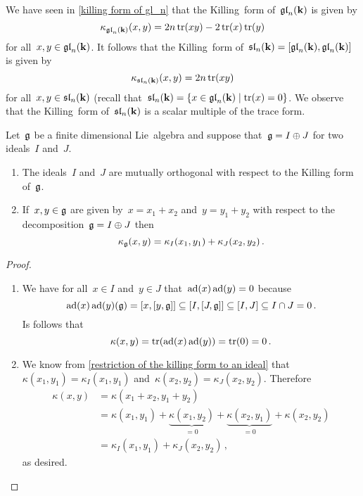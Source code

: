 

\begin{example}
  We have seen in \cref{killing form of gl_n} that the Killing~form of~$\mathfrak{gl}_n(\mathbf{k})$ is given by
  \[
    \kappa_{\mathfrak{gl}_n(\mathbf{k})}(x,y)
    =
    2n \operatorname{tr}(xy) - 2\operatorname{tr}(x)\operatorname{tr}(y)
  \]
  for all~$x, y \in \mathfrak{gl}_n(\mathbf{k})$.
  It follows that the Killing~form of~$\mathfrak{sl}_n(\mathbf{k}) = [\mathfrak{gl}_n(\mathbf{k}), \mathfrak{gl}_n(\mathbf{k})]$ is given by
  \[
    \kappa_{\mathfrak{sl}_n(\mathbf{k})}(x,y)
    =
    2n \operatorname{tr}(xy)
  \]
  for all~$x, y \in \mathfrak{sl}_n(\mathbf{k})$ (recall that~$\sllie_n(\kf) = \{x \in \gllie_n(\kf) \suchthat \tr(x) = 0\}$.
  We observe that the Killing~form of~$\mathfrak{sl}_n(\mathbf{k})$ is a scalar multiple of the trace form.
\end{example}


\begin{lemma}
  \label{orthogonal ideals with respect to the killing form}
  Let~$\mathfrak{g}$ be a finite dimensional Lie~algebra and suppose that~$\mathfrak{g} = I \oplus J$ for two ideals~$I$ and~$J$.
  \begin{enumerate}
    \item
      The ideals~$I$ and~$J$ are mutually orthogonal with respect to the Killing form of~$\mathfrak{g}$.
    \item
      If~$x,y \in \mathfrak{g}$ are given by~$x = x_1 + x_2$ and~$y = y_1 + y_2$ with respect to the decomposition~$\mathfrak{g} = I \oplus J$ then
      \[
        \kappa_{\mathfrak{g}}(x,y)
        =
        \kappa_I(x_1, y_1) + \kappa_J(x_2, y_2) \,.
      \]
  \end{enumerate}
\end{lemma}


\begin{proof}
  \leavevmode
  \begin{enumerate}
    \item
      We have for all~$x \in I$ and~$y \in J$ that~$\operatorname{ad}(x) \operatorname{ad}(y) = 0$ because
      \[
        \operatorname{ad}(x)\operatorname{ad}(y)(\mathfrak{g})
        =
        [x,[y,\mathfrak{g}]]
        \subseteq
        [I,[J,\mathfrak{g}]]
        \subseteq
        [I,J]
        \subseteq
        I \cap J
        =
        0 \,.
      \]
      Is follows that
      \[
        \kappa(x,y)
        =
        \operatorname{tr}(\operatorname{ad}(x)\operatorname{ad}(y))
        =
        \operatorname{tr}(0)
        =
        0 \,.
      \]
    \item
      We know from \cref{restriction of the killing form to an ideal} that~$\kappa(x_1, y_1) = \kappa_I(x_1, y_1)$ and~$\kappa(x_2, y_2) = \kappa_J(x_2, y_2)$.
      Therefore
      \begin{align*}
        \kappa(x,y)
        &=
        \kappa(x_1 + x_2, y_1 + y_2)
        \\
        &=
          \kappa(x_1, y_1)
        + \underbrace{\kappa(x_1, y_2)}_{=0}
        + \underbrace{\kappa(x_2, y_1)}_{=0}
        + \kappa(x_2, y_2)
        \\
        &=
        \kappa_I(x_1, y_1) + \kappa_J(x_2, y_2) \,,
      \end{align*}
      as desired.
    \qedhere
  \end{enumerate}
\end{proof}





